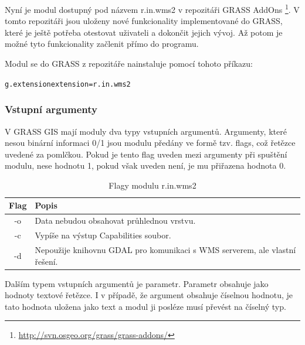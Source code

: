 \documentclass[a4paper,12pt]{article}
\begin{document}
Nyní je modul dostupný pod názvem r.in.wms2 v repozitáři GRASS
AddOns \footnote{\url{http://svn.osgeo.org/grass/grass-addons/}}. V
tomto repozitáři jsou uloženy nové funkcionality implementované do
GRASS, které je ještě potřeba otestovat uživateli a dokončit jejich
vývoj. Až potom je možné tyto funkcionality začlenit přímo do
programu.


Modul se do GRASS z repozitáře nainstaluje pomocí tohoto příkazu:
\begin{alltt}\footnotesize
g.extension extension=r.in.wms2
\end{alltt}

\subsubsection{Vstupní argumenty}

V GRASS GIS mají moduly dva typy vstupních argumentů. Argumenty, které
nesou binární informaci 0/1 jsou modulu předány ve formě tzv. flags,
což řetězce uvedené za pomlčkou. Pokud je tento flag uveden mezi
argumenty při spuštění modulu, nese hodnotu 1, pokud však uveden není,
je mu přiřazena hodnota 0.

\begin{table}[h]
\centering
\begin{tabular}{|c|l|}      \hline
  Flag      &    Popis				\\ \hline
   -o        &  Data nebudou obsahovat průhlednou  vrstvu.\\ \hline
   -c       &  Vypíše na výstup Capabilities soubor.\\ \hline
   -d       &  Nepoužije knihovnu GDAL pro komunikaci s WMS serverem, ale vlastní řešení. \\ \hline
\end{tabular}
\caption{Flagy modulu r.in.wms2}
\label{tab:flagy}
\end{table}

Dalším typem vstupních argumentů je parametr. Parametr obsahuje jako
hodnoty textové řetězce. I v případě, že argument obsahuje číselnou
hodnotu, je tato hodnota uložena jako text a modul ji posléze musí
převést na číselný typ.
\end{document}
